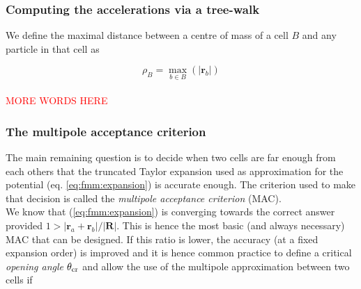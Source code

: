 \subsubsection{Computing the accelerations via a tree-walk}

We define the maximal distance between a centre of mass of a cell $B$ and
any particle in that cell as

\begin{equation}
  \rho_B = \max_{b \in B}(|\mathbf{r}_b|)
\end{equation}
\\
\textcolor{red}{MORE WORDS HERE}

\subsubsection{The multipole acceptance criterion}

The main remaining question is to decide when two cells are far enough from
each others that the truncated Taylor expansion used as approximation for
the potential (eq. \ref{eq:fmm:expansion}) is accurate enough. The
criterion used to make that decision is called the \emph{multipole
  acceptance criterion} (MAC). \\
We know that (\ref{eq:fmm:expansion}) is converging towards the correct
answer provided $1>|\mathbf{r}_a + \mathbf{r}_b| / |\mathbf{R}|$. This is
hence the most basic (and always necessary) MAC that can be designed. If
this ratio is lower, the accuracy (at a fixed expansion order) is improved
and it is hence common practice to define a critical \emph{opening angle}
$\theta_{\rm cr}$ and allow the use of the multipole approximation between
two cells if

